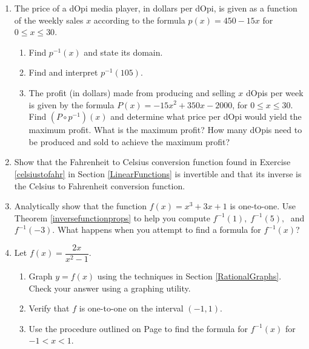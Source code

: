 \documentclass{ximera}
\begin{document}
\begin{enumerate}
\setcounter{enumi}{\value{HW}}

\item  The price of a dOpi media player, in dollars per dOpi, is given as a function of the weekly sales $x$ according to the formula $p(x) = 450-15x$ for $0 \leq x \leq 30$.

\begin{enumerate}

\item  Find $p^{-1}(x)$ and state its domain.

\item  Find and interpret $p^{-1}(105)$.

\item  The profit (in dollars) made from producing and selling $x$ dOpis per week is given by the formula $P(x)= -15x^2+350x-2000$, for $0 \leq x \leq 30$.  Find $\left(P \circ p^{-1}\right)(x)$ and determine what price per dOpi would yield the maximum profit.  What is the maximum profit?  How many dOpis need to be produced and sold to achieve the maximum profit?
\end{enumerate}

\item Show that the Fahrenheit to Celsius conversion function found in Exercise \ref{celsiustofahr} in Section \ref{LinearFunctions} is invertible and that its inverse is the Celsius to Fahrenheit conversion function.

\item Analytically show that the function $f(x) = x^3 + 3x + 1$ is one-to-one.  Use Theorem \ref{inversefunctionprops} to help you compute $f^{-1}(1), \; f^{-1}(5), \;$ and $f^{-1}(-3)$.  What happens when you attempt to find a formula for $f^{-1}(x)$?


\item  Let $f(x) = \dfrac{2x}{x^2-1}$.  

\begin{enumerate}

\item  Graph $y = f(x)$ using the techniques  in Section \ref{RationalGraphs}.  Check your answer using a graphing utility.

\item Verify that $f$ is one-to-one on the interval $(-1,1)$.  

\item Use the procedure outlined on Page \pageref{inverseprocedure} to find the formula for $f^{-1}(x)$ for $-1 < x < 1$.


\end{enumerate}
\end{enumerate}
\end{document}
